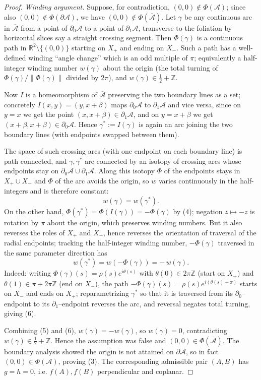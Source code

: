\begin{proof}
\emph{Winding argument.} Suppose, for contradiction, $(0,0)\notin\Phi(\mathcal A)$;
since also $(0,0)\notin\Phi(\partial\mathcal A)$, we have
$(0,0)\notin\Phi(\overline{\mathcal A})$. Let $\gamma$ be any continuous arc in
$\overline{\mathcal A}$ from a point of $\partial_0\mathcal A$ to a point of
$\partial_1\mathcal A$, transverse to the foliation by horizontal slices say a
straight crossing segment. Then $\Phi(\gamma)$ is a continuous path in
$\mathbb{R}^2\setminus\{(0,0)\}$ starting on $X_+$ and ending on $X_-$. Such a path
has a well-defined winding ``angle change'' which is an odd multiple of $\pi$;
equivalently a half-integer winding number $w(\gamma)$ about the origin (the total
turning of $\Phi(\gamma)/\|\Phi(\gamma)\|$ divided by $2\pi$), and
$w(\gamma)\in\tfrac12+\mathbb{Z}$.

Now $I$ is a homeomorphism of $\overline{\mathcal A}$ preserving the two boundary
lines as a set; concretely $I(x,y)=(y,x+\beta)$ maps $\partial_0\mathcal A$ to
$\partial_1\mathcal A$ and vice versa, since on $y=x$ we get the point
$(x,x+\beta)\in\partial_1\mathcal A$, and on $y=x+\beta$ we get
$(x+\beta,x+\beta)\in\partial_0\mathcal A$. Hence $\gamma^*:=I(\gamma)$ is again an
arc joining the two boundary lines (with endpoints swapped between them).

The space of such crossing arcs (with one endpoint on each boundary line) is path
connected, and $\gamma,\gamma^*$ are connected by an isotopy of crossing arcs whose
endpoints stay on $\partial_0\mathcal A\cup\partial_1\mathcal A$. Along this isotopy
$\Phi$ of the endpoints stays in $X_+\cup X_-$ and $\Phi$ of the arc avoids the
origin, so $w$ varies continuously in the half-integers and is therefore constant:
\[
w(\gamma)=w(\gamma^*). \tag{5}
\]
On the other hand, $\Phi(\gamma^*)=\Phi(I(\gamma))=-\Phi(\gamma)$ by (4); negation
$z\mapsto -z$ is rotation by $\pi$ about the origin, which preserves winding
numbers. But it also reverses the roles of $X_+$ and $X_-$, hence reverses the
orientation of traversal of the radial endpoints; tracking the half-integer winding
number, $-\Phi(\gamma)$ traversed in the same parameter direction has
\[
w(\gamma^*)=w(-\Phi(\gamma))=-\,w(\gamma). \tag{6}
\]
Indeed: writing $\Phi(\gamma)(s)=\rho(s)e^{i\theta(s)}$ with $\theta(0)\in 2\pi\mathbb{Z}$
(start on $X_+$) and $\theta(1)\in \pi+2\pi\mathbb{Z}$ (end on $X_-$), the path
$-\Phi(\gamma)(s)=\rho(s)e^{i(\theta(s)+\pi)}$ starts on $X_-$ and ends on $X_+$;
reparametrizing $\gamma^*$ so that it is traversed from its
$\partial_0$--endpoint to its $\partial_1$--endpoint reverses the arc, and reversal
negates total turning, giving (6).

Combining (5) and (6), $w(\gamma)=-w(\gamma)$, so $w(\gamma)=0$, contradicting
$w(\gamma)\in\tfrac12+\mathbb{Z}$. Hence the assumption was false and
$(0,0)\in\Phi(\overline{\mathcal A})$. The boundary analysis showed the origin is
not attained on $\partial\mathcal A$, so in fact $(0,0)\in\Phi(\mathcal A)$, proving
(3). The corresponding admissible pair $(A,B)$ has $g=h=0$, i.e. $f(A),f(B)$
perpendicular and coplanar.
\end{proof}

